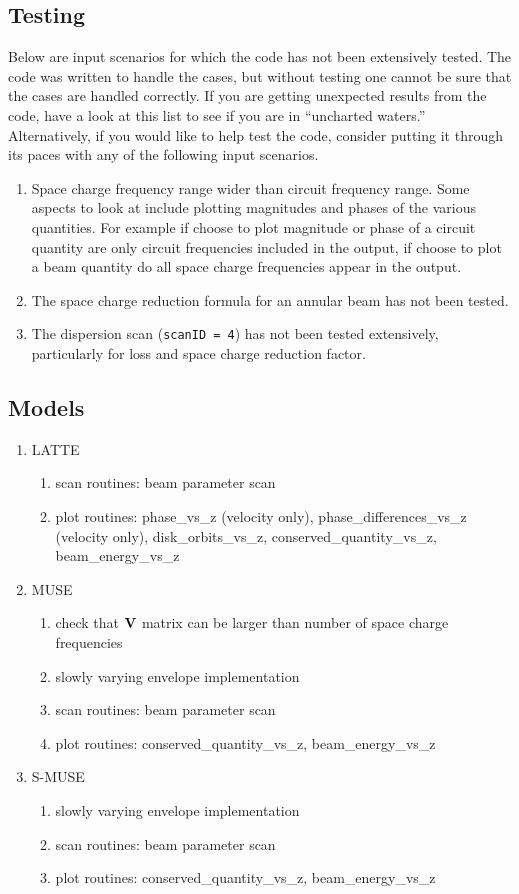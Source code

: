 \documentclass{article}
\begin{document}
\subsection{Testing}
Below are input scenarios for which the code has not been extensively tested.
The code was written to handle the cases, but without testing one cannot
be sure that the cases are handled correctly. If you are getting unexpected
results from the code, have a look at this list to see if you are in
``uncharted waters.'' Alternatively, if you would like to help test the
code, consider putting it through its paces with any of the following
input scenarios.
\begin{enumerate}
\item Space charge frequency range wider than circuit frequency range. Some
  aspects to look at include plotting magnitudes and phases of the various
  quantities. For example if choose to plot magnitude or phase of a circuit
  quantity are only circuit frequencies included in the output, if choose to
  plot a beam quantity do all space charge frequencies appear in the output.
\item The space charge reduction formula for an annular beam has not been
  tested.
\item The dispersion scan ({\tt scanID = 4}) has not been tested extensively,
  particularly for loss and space charge reduction factor.
\end{enumerate}
\subsection{Models}
\begin{enumerate}
\item LATTE
  \begin{enumerate}
  \item scan routines: beam parameter scan
  \item plot routines:
    phase\_vs\_z (velocity only), phase\_differences\_vs\_z (velocity only),
    disk\_orbits\_vs\_z, conserved\_quantity\_vs\_z, beam\_energy\_vs\_z
  \end{enumerate}
\item MUSE
  \begin{enumerate}
  \item check that ${\bf V}$ matrix can be larger than number of space charge
    frequencies
  \item slowly varying envelope implementation
  \item scan routines: beam parameter scan
  \item plot routines:
    conserved\_quantity\_vs\_z, beam\_energy\_vs\_z
  \end{enumerate}
\item S-MUSE
  \begin{enumerate}
  \item slowly varying envelope implementation
  \item scan routines: beam parameter scan
  \item plot routines:
    conserved\_quantity\_vs\_z, beam\_energy\_vs\_z
  \end{enumerate}
\end{enumerate}
\end{document}
